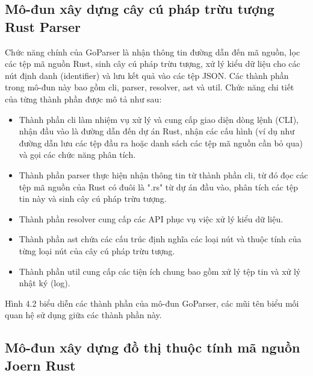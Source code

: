 \subsection{Mô-đun xây dựng cây cú pháp trừu tượng Rust Parser}

Chức năng chính của GoParser là nhận thông tin đường dẫn đến mã nguồn, lọc các
tệp mã nguồn Rust, sinh cây cú pháp trừu tượng, xử lý kiểu dữ liệu cho các nút định danh
(identifier) và lưu kết quả vào các tệp JSON. Các thành phần trong mô-đun này bao gồm
cli, parser, resolver, ast và util. Chức năng chi tiết của từng thành phần được mô tả như
sau:

\begin{itemize}
\item Thành phần cli làm nhiệm vụ xử lý và cung cấp giao diện dòng lệnh (CLI), nhận
đầu vào là đường dẫn đến dự án Rust, nhận các cấu hình (ví dụ như đường dẫn lưu
các tệp đầu ra hoặc danh sách các tệp mã nguồn cần bỏ qua) và gọi các chức năng
phân tích.
\item Thành phần parser thực hiện nhận thông tin từ thành phần cli, từ đó đọc các tệp mã
nguồn của Rust có đuôi là ".rs" từ dự án đầu vào, phân tích các tệp tin này và sinh
cây cú pháp trừu tượng.
\item Thành phần resolver cung cấp các API phục vụ việc xử lý kiểu dữ liệu.
\item Thành phần ast chứa các cấu trúc định nghĩa các loại nút và thuộc tính của từng
loại nút của cây cú pháp trừu tượng.
\item Thành phần util cung cấp các tiện ích chung bao gồm xử lý tệp tin và xử lý nhật ký
(log).
\end{itemize}
Hình 4.2 biểu diễn các thành phần của mô-đun GoParser, các mũi tên biểu mối
quan hệ sử dụng giữa các thành phần này.

\subsection{Mô-đun xây dựng đồ thị thuộc tính mã nguồn Joern Rust}

